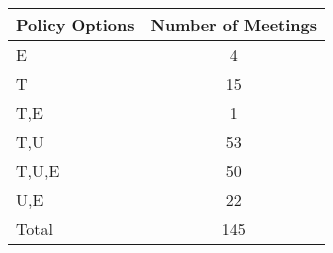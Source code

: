 \begin{tabular}{lc}
\hline\hline 
\addlinespace 
Policy Options & Number of Meetings \\ 
\hline 
E & 4 \\
T & 15 \\
T,E & 1 \\
T,U & 53 \\
T,U,E & 50 \\
U,E & 22 \\
\addlinespace 
Total & 145 \\
\hline 
\end{tabular}